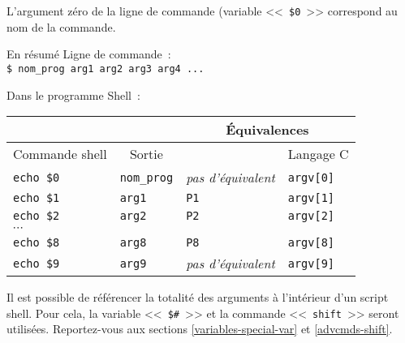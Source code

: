 L'argument z{\'e}ro de la ligne de commande (variable <<~\verb=$0=~>> correspond au
nom de la commande.

\begin{definition}{En r{\'e}sum{\'e}}
Ligne de commande~:\\
\verb=$ nom_prog arg1 arg2 arg3 arg4 ...=

Dans le programme Shell~:\\

\begin{tabular}{|l|l|l|l|}
		\hline
		\multicolumn{2}{|l|}{}					&
		\multicolumn{2}{|c|}{\'{E}quivalences}	\\
	\hline
		\multicolumn{1}{|c|}{Commande shell}	&
		\multicolumn{1}{|c|}{Sortie}			&
		\multicolumn{1}{|c|}{{\OpenVMS}}		&
		\multicolumn{1}{|c|}{Langage C}			\\
	\hline \hline
		{\tt echo \$0}					&
		{\tt nom\_prog}					&
		{\sl pas d'{\'e}quivalent}			&
		{\tt argv[0]}					\\
	\hline
		{\tt echo \$1}					&
		{\tt arg1}						&
		{\tt P1}						&
		{\tt argv[1]}					\\
	\hline
		{\tt echo \$2}					&
		{\tt arg2}						&
		{\tt P2}						&
		{\tt argv[2]}					\\
	\hline
		\multicolumn{4}{|l|}{$\cdots$}	\\
	\hline
		{\tt echo \$8}					&
		{\tt arg8}						&
		{\tt P8}						&
		{\tt argv[8]}					\\
	\hline
		{\tt echo \$9}					&
		{\tt arg9}						&
		{\sl pas d'{\'e}quivalent}			&
		{\tt argv[9]}					\\
	\hline
\end{tabular}
\end{definition}

Il est possible de r{\'e}f{\'e}rencer la totalit{\'e} des arguments
{\`a} l'int{\'e}rieur d'un script shell. Pour cela, la variable
<<~\verb=$#=~>> et la commande
<<~{\tt shift}~>> seront utilis{\'e}es.
Reportez-vous aux sections \ref{variables-special-var} et
\ref{advcmds-shift}.
